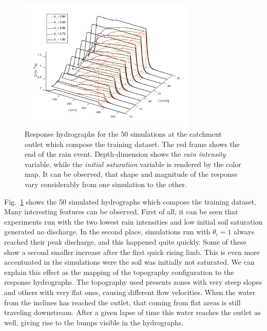 \begin{figure}[h]
  \centering
  \includegraphics[width=0.75\textwidth]{Figures/hydrographs3d.png}
  \caption{Response hydrographs for the \num{50} simulations at the catchment outlet which compose the training dataset. The red frame shows the end of the rain event. Depth-dimension shows the \emph{rain intensity} variable, while the \emph{initial saturation} variable is rendered by the color map. It can be observed, that shape and magnitude of the response vary considerably from one simulation to the other.}
  \label{fig:hydrographs3d}
\end{figure}


Fig.~\ref{fig:hydrographs3d} shows the \num{50} simulated hydrographs which compose the training dataset.
Many interesting features can be observed.
First of all, it can be seen that experiments run with the two lowest rain intensities and low initial soil saturation generated no discharge.
In the second place, simulations run with $\theta_i = \num{1}$ always reached their peak discharge, and this happened quite quickly.
Some of these show a second smaller increase after the first quick rising limb.
This is even more accentuated in the simulations were the soil was initially not saturated.
We can explain this effect as the mapping of the topography configuration to the response hydrographs.
The topography used presents zones with very steep slopes and others with very flat ones, causing different flow velocities.
When the water from the inclines has reached the outlet, that coming from flat areas is still traveling downstream.
After a given lapse of time this water reaches the outlet as well, giving rise to the bumps visible in the hydrographs.\\

